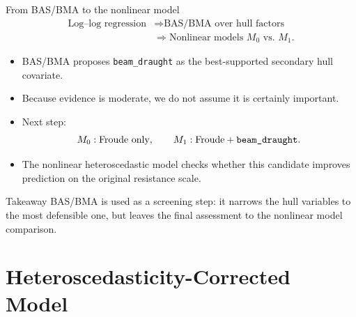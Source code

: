 \documentclass[11pt,aspectratio=169]{beamer}
\begin{document}
\begin{frame}{From BAS/BMA to the nonlinear model}
	\[
		\begin{aligned}
			\text{Log--log regression}
			&\Longrightarrow \text{BAS/BMA over hull factors}\\
			&\Longrightarrow \text{Nonlinear models } M_0 \text{ vs. } M_1.
		\end{aligned}
	\]
	\begin{itemize}
		\item BAS/BMA proposes \texttt{beam\_draught} as the best-supported secondary hull covariate.
		\item Because evidence is moderate, we do not assume it is certainly important.
		\item Next step:
		\[
			M_0: \text{Froude only}, \qquad
			M_1: \text{Froude} + \text{\texttt{beam\_draught}}.
		\]
		\item The nonlinear heteroscedastic model checks whether this candidate improves
		      prediction on the original resistance scale.
	\end{itemize}
	\begin{block}{Takeaway}
		BAS/BMA is used as a screening step: it narrows the hull variables to the most
		defensible one, but leaves the final assessment to the nonlinear model comparison.
	\end{block}
\end{frame}


\section{Heteroscedasticity-Corrected Model}

\end{document}
